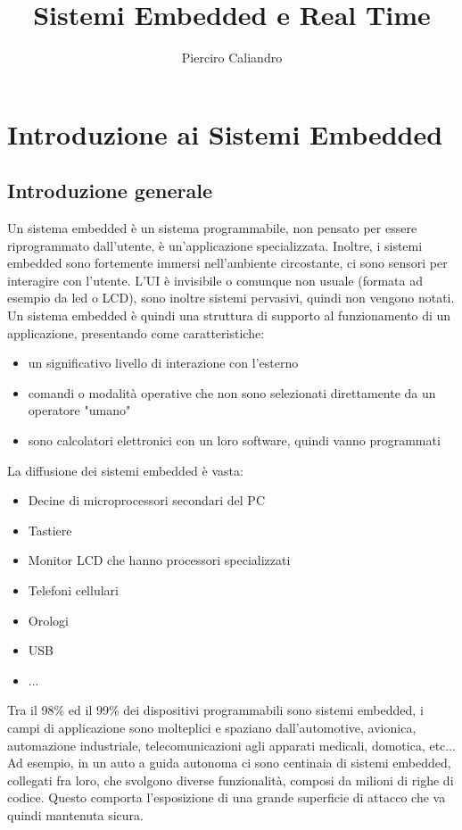 \documentclass[12pt, oneside]{extbook}
\author{Pierciro Caliandro}
\title{Sistemi Embedded e Real Time}
\begin{document}
\maketitle
\tableofcontents
\chapter{Introduzione ai Sistemi Embedded}
\section{Introduzione generale}
Un sistema embedded è un sistema programmabile, non pensato per essere riprogrammato dall'utente, è un'applicazione specializzata. Inoltre, i sistemi embedded sono fortemente immersi nell'ambiente circostante, ci sono sensori per interagire con l'utente. L'UI è invisibile o comunque non usuale (formata ad esempio da led o LCD), sono inoltre sistemi pervasivi, quindi non vengono notati.\\ Un sistema embedded è quindi una struttura di supporto al funzionamento di un applicazione, presentando come caratteristiche:
\begin{itemize}
\item un significativo livello di interazione con l'esterno
\item comandi o modalità operative che non sono selezionati direttamente da un operatore "umano"
\item sono calcolatori elettronici con un loro software, quindi vanno programmati
\end{itemize}
La diffusione dei sistemi embedded è vasta:
\begin{itemize}
\item Decine di microprocessori secondari del PC
\item Tastiere
\item Monitor LCD che hanno processori specializzati
\item Telefoni cellulari
\item Orologi
\item USB
\item ...
\end{itemize}
Tra il 98\% ed il 99\% dei dispositivi programmabili sono sistemi embedded, i campi di applicazione sono molteplici e spaziano dall'automotive, avionica, automazione industriale, telecomunicazioni agli apparati medicali, domotica, etc...\\ Ad esempio, in un auto a guida autonoma ci sono centinaia di sistemi embedded, collegati fra loro, che svolgono diverse funzionalità, composi da milioni di righe di codice. Questo comporta l'esposizione di una grande superficie di attacco che va quindi mantenuta sicura.
\end{document}

